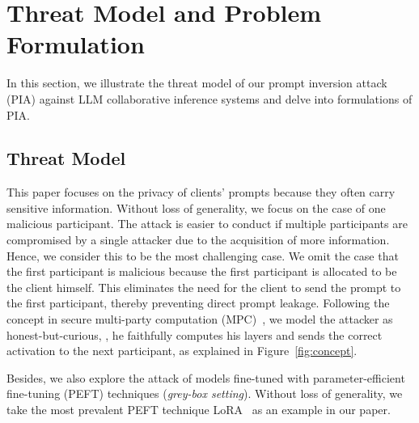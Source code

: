 
\section{Threat Model and Problem Formulation}
In this section, we illustrate the threat model of our prompt inversion attack (PIA) against LLM collaborative inference systems and delve into formulations of PIA.







\subsection{Threat Model}
\label{sec:threat_model}
This paper focuses on the privacy of clients' prompts because they often carry sensitive information. Without loss of generality, we focus on the case of one malicious participant. The attack is easier to conduct if multiple participants are compromised by a single attacker due to the acquisition of more information. Hence, we consider this to be the most challenging case.  We omit the case that the first participant is malicious because the first participant is allocated to be the client himself. This eliminates the need for the client to send the prompt to the first participant, thereby preventing direct prompt leakage.  Following the concept in secure multi-party computation (MPC)~\cite{yao1986generate,beerliova2008perfectly}, we model the attacker as honest-but-curious, \ie, he faithfully computes his layers and sends the correct activation to the next participant, as explained in Figure~\ref{fig:concept}.


Besides, we also explore the attack of models fine-tuned with parameter-efficient fine-tuning (PEFT) techniques (\emph{grey-box setting}). Without loss of generality, we take the most prevalent PEFT technique LoRA~\cite{lora} as an example in our paper.

